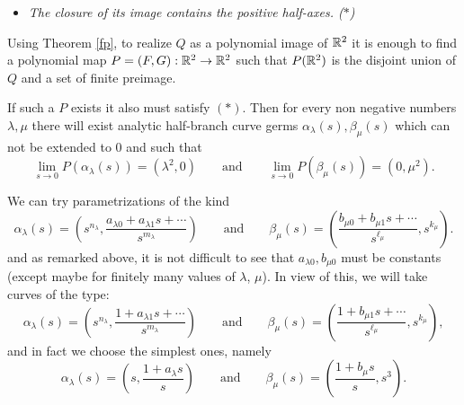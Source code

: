 \documentclass[11pt,draft]{article}
\begin{document}
\begin{itemize}
\item[ ] \em The closure of its image contains the positive half-axes\em. ($\ast$) 
\end{itemize}

Using Theorem \ref{fp}, to realize $Q$ as a polynomial image of ${\mathbb R}^2$ it is enough to find a
polynomial map $P=(F,G):{\mathbb R}^2\rightarrow{\mathbb R}^2$ such that $P({\mathbb R}^2)$ is the disjoint union of $Q$
and a set of finite preimage.

If such a $P$ exists it also must satisfy $(\ast)$. Then for every non negative numbers
$\lambda,\mu$ there will exist analytic half-branch curve germs
$\alpha_{\lambda}(s),\beta_{\mu}(s)$ which can not be extended to $0$ and such that
$$
\lim_{s\rightarrow 0} P(\alpha_{\lambda}(s))=(\lambda^2,0)\qquad \text{and} \qquad
\lim_{s\rightarrow 0} P(\beta_{\mu}(s))=(0,\mu^2).
$$

We can try parametrizations of the kind
$$
\alpha_{\lambda}(s)=\left(s^{n_{\lambda}},\frac{a_{\lambda 0}+a_{\lambda 1}s+\cdots}{s^{m_{\lambda}}}\right)\qquad \text{and} \qquad
\beta_{\mu}(s)=\left(\frac{b_{\mu 0}+b_{\mu 1}s+\cdots}{s^{\ell_{\mu}}},s^{k_{\mu}}\right).
$$
and as remarked above, it is not difficult to see that 
$a_{\lambda 0},b_{\mu 0}$ must be constants (except maybe for finitely many values of
$\lambda$, $\mu$). In view of this, we will take curves of the type:
$$
\alpha_{\lambda}(s)=\left(s^{n_{\lambda}},\frac{1+a_{\lambda 1}s+\cdots}{s^{m_{\lambda}}}\right)\qquad \text{and} \qquad
\beta_{\mu}(s)=\left(\frac{1+b_{\mu 1}s+\cdots}{s^{\ell_{\mu}}},s^{k_{\mu}}\right),
$$
and in fact we choose the simplest ones, namely 
$$
\alpha_{\lambda}(s)=\left(s,\frac{1+a_{\lambda }s}{s}\right)\qquad \text{and} \qquad
\beta_{\mu}(s)=\left(\frac{1+b_{\mu }s}{s},s^{3}\right).
$$
\end{document}
